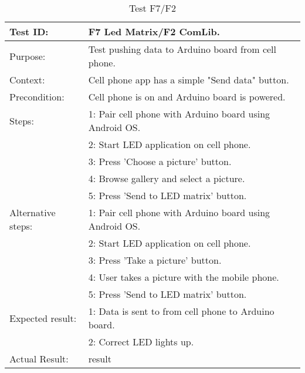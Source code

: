 \begin{table}[h!]
\begin{tabular}{|l|p{10cm}|}
\hline Test ID: & F7 Led Matrix/F2 ComLib. \\ 
\hline Purpose: & Test pushing data to Arduino board from cell phone. \\ 
\hline Context: & Cell phone app has a simple "Send data" button. \\ 
\hline Precondition: & Cell phone is on and Arduino board is powered. \\ 
\hline
Steps:
  & 1: Pair cell phone with Arduino board using Android OS.\\ 
  & 2: Start LED application on cell phone. \\ 
  & 3: Press 'Choose a picture' button. \\
  & 4: Browse gallery and select a picture. \\
  & 5: Press 'Send to LED matrix' button. \\
\hline
Alternative steps:
  & 1: Pair cell phone with Arduino board using Android OS.\\ 
  & 2: Start LED application on cell phone. \\ 
  & 3: Press 'Take a picture' button. \\
  & 4: User takes a picture with the mobile phone. \\
  & 5: Press 'Send to LED matrix' button. \\
\hline
Expected result:
  & 1: Data is sent to from cell phone to Arduino board.\\ 
  & 2: Correct LED lights up. \\ 
\hline
Actual Result: &  result \\
\hline
\end{tabular}
\caption{Test F7/F2}
\label{tbl:f7f2test}
\end{table}

